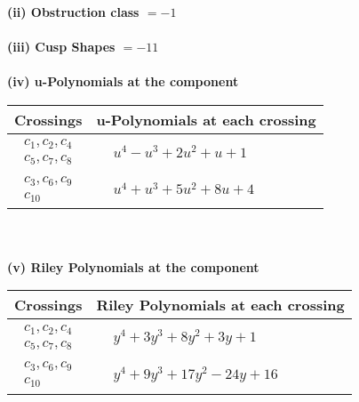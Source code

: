 \documentclass[1p]{elsarticle_modified}
\theoremstyle{definition}
\begin{document}
\flushleft \textbf{(ii) Obstruction class $= -1$}\\~\\
\flushleft \textbf{(iii) Cusp Shapes $= -11$}\\~\\
\newpage\renewcommand{\arraystretch}{1}
\flushleft \textbf{(iv) u-Polynomials at the component}\newline \\
\begin{tabular}{m{50pt}|m{274pt}}
Crossings & \hspace{64pt}u-Polynomials at each crossing \\
\hline $$\begin{aligned}c_{1},c_{2},c_{4}\\c_{5},c_{7},c_{8}\end{aligned}$$&$\begin{aligned}
&u^4- u^3+2 u^2+u+1
\end{aligned}$\\
\hline $$\begin{aligned}c_{3},c_{6},c_{9}\\c_{10}\end{aligned}$$&$\begin{aligned}
&u^4+u^3+5 u^2+8 u+4
\end{aligned}$\\
\hline
\end{tabular}\\~\\
\newpage\renewcommand{\arraystretch}{1}
\flushleft \textbf{(v) Riley Polynomials at the component}\newline \\
\begin{tabular}{m{50pt}|m{274pt}}
Crossings & \hspace{64pt}Riley Polynomials at each crossing \\
\hline $$\begin{aligned}c_{1},c_{2},c_{4}\\c_{5},c_{7},c_{8}\end{aligned}$$&$\begin{aligned}
&y^4+3 y^3+8 y^2+3 y+1
\end{aligned}$\\
\hline $$\begin{aligned}c_{3},c_{6},c_{9}\\c_{10}\end{aligned}$$&$\begin{aligned}
&y^4+9 y^3+17 y^2-24 y+16
\end{aligned}$\\
\hline
\end{tabular}\\~\\
\end{document}
